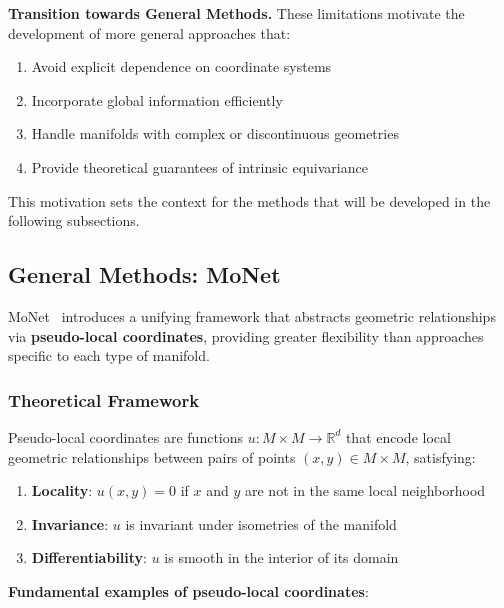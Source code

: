 \textbf{Transition towards General Methods.} These limitations motivate the development of more general approaches that:
\begin{enumerate}
    \item Avoid explicit dependence on coordinate systems
    \item Incorporate global information efficiently
    \item Handle manifolds with complex or discontinuous geometries
    \item Provide theoretical guarantees of intrinsic equivariance
\end{enumerate}
This motivation sets the context for the methods that will be developed in the following subsections.

\subsection{General Methods: MoNet}\label{subsec:monet}

MoNet~\citep{DBLP:journals/corr/MontiBMRSB16} introduces a unifying framework that abstracts geometric relationships via \textbf{pseudo-local coordinates}, providing greater flexibility than approaches specific to each type of manifold.

\subsubsection{Theoretical Framework}

\begin{definition}\label{def:coordenadas_pseudo_locales}
Pseudo-local coordinates are functions $u: M \times M \to \mathbb{R}^d$ that encode local geometric relationships between pairs of points $(x, y) \in M \times M$, satisfying:
\begin{enumerate}
    \item \textbf{Locality}: $u(x, y) = 0$ if $x$ and $y$ are not in the same local neighborhood
    \item \textbf{Invariance}: $u$ is invariant under isometries of the manifold
    \item \textbf{Differentiability}: $u$ is smooth in the interior of its domain
\end{enumerate}
\end{definition}

\textbf{Fundamental examples of pseudo-local coordinates}:

